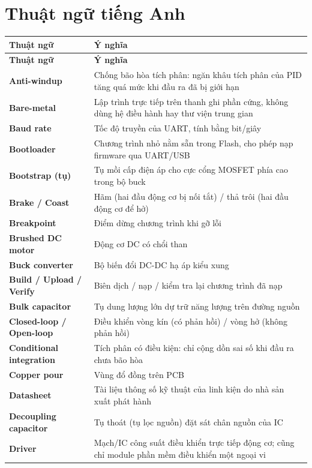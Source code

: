 \section*{Thuật ngữ tiếng Anh}
{\small
\begin{longtable}{@{}>{\raggedright\arraybackslash\bfseries}p{3.6cm}>{\raggedright\arraybackslash}p{11.3cm}@{}}
\toprule
\normalfont\bfseries Thuật ngữ & \textbf{Ý nghĩa}\\
\midrule\endfirsthead
\toprule
\normalfont\bfseries Thuật ngữ & \textbf{Ý nghĩa}\\
\midrule\endhead
\bottomrule\endfoot
Anti-windup & Chống bão hòa tích phân: ngăn khâu tích phân của PID tăng quá mức khi đầu ra đã bị giới hạn\\
Bare-metal & Lập trình trực tiếp trên thanh ghi phần cứng, không dùng hệ điều hành hay thư viện trung gian\\
Baud rate & Tốc độ truyền của UART, tính bằng bit/giây\\
Bootloader & Chương trình nhỏ nằm sẵn trong Flash, cho phép nạp firmware qua UART/USB\\
Bootstrap (tụ) & Tụ mồi cấp điện áp cho cực cổng MOSFET phía cao trong bộ buck\\
Brake / Coast & Hãm (hai đầu động cơ bị nối tắt) / thả trôi (hai đầu động cơ để hở)\\
Breakpoint & Điểm dừng chương trình khi gỡ lỗi\\
Brushed DC motor & Động cơ DC có chổi than\\
Buck converter & Bộ biến đổi DC-DC hạ áp kiểu xung\\
Build / Upload / Verify & Biên dịch / nạp / kiểm tra lại chương trình đã nạp\\
Bulk capacitor & Tụ dung lượng lớn dự trữ năng lượng trên đường nguồn\\
Closed-loop / Open-loop & Điều khiển vòng kín (có phản hồi) / vòng hở (không phản hồi)\\
Conditional integration & Tích phân có điều kiện: chỉ cộng dồn sai số khi đầu ra chưa bão hòa\\
Copper pour & Vùng đổ đồng trên PCB\\
Datasheet & Tài liệu thông số kỹ thuật của linh kiện do nhà sản xuất phát hành\\
Decoupling capacitor & Tụ thoát (tụ lọc nguồn) đặt sát chân nguồn của IC\\
Driver & Mạch/IC công suất điều khiển trực tiếp động cơ; cũng chỉ module phần mềm điều khiển một ngoại vi\\

\end{longtable}}
